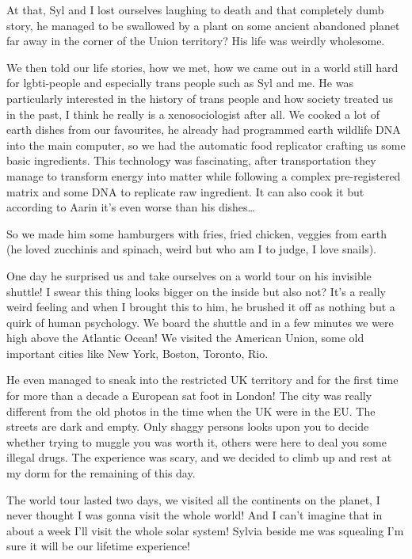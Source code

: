 \documentclass[colorlinks,12pt,a4paper]{book}
\begin{document}
At that, Syl and I lost ourselves laughing to death and that completely dumb story, he managed to be swallowed by a plant 
on some ancient abandoned planet far away in the corner of the Union territory? His life was weirdly wholesome.\par
\bigskip
We then told our life stories, how we met, how we came out in a world still hard for lgbti-people and especially trans 
people such as Syl and me. He was particularly interested in the history of trans people and how society treated us in 
the past, I think he really is a xenosociologist after all. We cooked a lot of earth dishes from our favourites, he already
 had programmed earth wildlife DNA into the main computer, so we had the automatic food replicator crafting us some basic 
 ingredients. This technology was fascinating, after transportation they manage to transform energy into matter while 
 following a complex pre-registered matrix and some DNA to replicate raw ingredient. It can also cook it but 
 according to Aarin it's even worse than his dishes…\par
 \bigskip

So we made him some hamburgers with fries, fried chicken, veggies from earth (he loved zucchinis and spinach, 
weird but who am I to judge, I love snails). \par
\bigskip

One day he surprised us and take ourselves on a world tour on his invisible shuttle! I swear this thing looks 
bigger on the inside but also not? It's a really weird feeling and when I brought this to him, he brushed 
it off as nothing but a quirk of human psychology. We board the shuttle and in a few minutes we were high above 
the Atlantic Ocean! We visited the American Union, some old important cities like New York, Boston, Toronto, Rio.\par
\bigskip

He even managed to sneak into the restricted UK territory and for the first time for more than a decade a European sat 
foot in London! The city was really different from the old photos in the time when the UK were in the EU. 
The streets are dark and empty. Only shaggy persons looks upon you to decide whether trying to muggle you 
was worth it, others were here to deal you some illegal drugs. The experience was scary, and we decided to 
climb up and rest at my dorm for the remaining of this day.\par
\bigskip

The world tour lasted two days, we visited all the continents on the planet, I never thought I was gonna visit the whole 
world! And I can't imagine that in about a week I'll visit the whole solar system! Sylvia beside me was squealing 
 I'm sure it will be our lifetime experience!\par
 \bigskip
\end{document}
